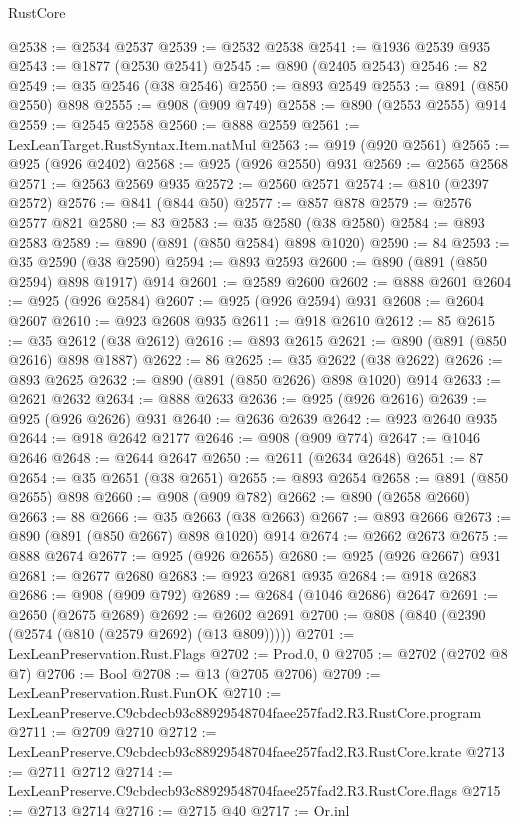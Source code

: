 \begin{lexlean}{RustCore}
\begin{coremodule}
@2538 := @2534 @2537
@2539 := @2532 @2538
@2541 := @1936 @2539 @935
@2543 := @1877 (@2530 @2541)
@2545 := @890 (@2405 @2543)
@2546 := 82
@2549 := @35 @2546 (@38 @2546)
@2550 := @893 @2549
@2553 := @891 (@850 @2550) @898
@2555 := @908 (@909 @749)
@2558 := @890 (@2553 @2555) @914
@2559 := @2545 @2558
@2560 := @888 @2559
@2561 := LexLeanTarget.RustSyntax.Item.natMul
@2563 := @919 (@920 @2561)
@2565 := @925 (@926 @2402)
@2568 := @925 (@926 @2550) @931
@2569 := @2565 @2568
@2571 := @2563 @2569 @935
@2572 := @2560 @2571
@2574 := @810 (@2397 @2572)
@2576 := @841 (@844 @50)
@2577 := @857 @878
@2579 := @2576 @2577 @821
@2580 := 83
@2583 := @35 @2580 (@38 @2580)
@2584 := @893 @2583
@2589 := @890 (@891 (@850 @2584) @898 @1020)
@2590 := 84
@2593 := @35 @2590 (@38 @2590)
@2594 := @893 @2593
@2600 := @890 (@891 (@850 @2594) @898 @1917) @914
@2601 := @2589 @2600
@2602 := @888 @2601
@2604 := @925 (@926 @2584)
@2607 := @925 (@926 @2594) @931
@2608 := @2604 @2607
@2610 := @923 @2608 @935
@2611 := @918 @2610
@2612 := 85
@2615 := @35 @2612 (@38 @2612)
@2616 := @893 @2615
@2621 := @890 (@891 (@850 @2616) @898 @1887)
@2622 := 86
@2625 := @35 @2622 (@38 @2622)
@2626 := @893 @2625
@2632 := @890 (@891 (@850 @2626) @898 @1020) @914
@2633 := @2621 @2632
@2634 := @888 @2633
@2636 := @925 (@926 @2616)
@2639 := @925 (@926 @2626) @931
@2640 := @2636 @2639
@2642 := @923 @2640 @935
@2644 := @918 @2642 @2177
@2646 := @908 (@909 @774)
@2647 := @1046 @2646
@2648 := @2644 @2647
@2650 := @2611 (@2634 @2648)
@2651 := 87
@2654 := @35 @2651 (@38 @2651)
@2655 := @893 @2654
@2658 := @891 (@850 @2655) @898
@2660 := @908 (@909 @782)
@2662 := @890 (@2658 @2660)
@2663 := 88
@2666 := @35 @2663 (@38 @2663)
@2667 := @893 @2666
@2673 := @890 (@891 (@850 @2667) @898 @1020) @914
@2674 := @2662 @2673
@2675 := @888 @2674
@2677 := @925 (@926 @2655)
@2680 := @925 (@926 @2667) @931
@2681 := @2677 @2680
@2683 := @923 @2681 @935
@2684 := @918 @2683
@2686 := @908 (@909 @792)
@2689 := @2684 (@1046 @2686) @2647
@2691 := @2650 (@2675 @2689)
@2692 := @2602 @2691
@2700 := @808 (@840 (@2390 (@2574 (@810 (@2579 @2692) (@13 @809)))))
@2701 := LexLeanPreservation.Rust.Flags
@2702 := Prod.{0, 0}
@2705 := @2702 (@2702 @8 @7)
@2706 := Bool
@2708 := @13 (@2705 @2706)
@2709 := LexLeanPreservation.Rust.FunOK
@2710 := LexLeanPreserve.C9cbdecb93c88929548704faee257fad2.R3.RustCore.program
@2711 := @2709 @2710
@2712 := LexLeanPreserve.C9cbdecb93c88929548704faee257fad2.R3.RustCore.krate
@2713 := @2711 @2712
@2714 := LexLeanPreserve.C9cbdecb93c88929548704faee257fad2.R3.RustCore.flags
@2715 := @2713 @2714
@2716 := @2715 @40
@2717 := Or.inl

\end{coremodule}
\end{lexlean}
